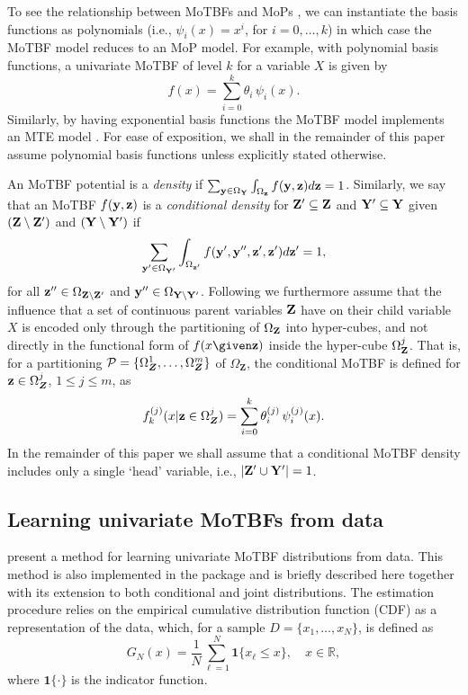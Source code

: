 To see the relationship between MoTBFs and MoPs \citep{She11}, we can instantiate the  basis functions as polynomials (i.e.,
$\psi_i(x)=x^i$, for $i=0,\ldots,k$) in which case the MoTBF model reduces to an MoP model. For
example, with polynomial basis functions, a univariate MoTBF of level $k$ for a variable $X$ is given by
\[
f(x) =   \sum_{i=0}^k \theta_{i}\, \psi_i\left( x \right).
\]
Similarly, by having exponential basis functions the MoTBF model implements an MTE model \citep{Mor01}. 
For ease of exposition, we shall in the remainder of this paper assume polynomial basis functions unless
explicitly stated otherwise.



An MoTBF potential is a \emph{density}\/  if  $\sum_{\mathbf{y}\in \Omega_{\mathbf{Y}}} \int_{\Omega_{\mathbf{z}}}
f(\mathbf{y},\mathbf{z}) d\mathbf{z} = 1$. Similarly, we say that an MoTBF $f(\mathbf{y},\mathbf{z})$ is a \emph{conditional density} for
$\mathbf{Z}'\subseteq \mathbf{Z}$ and $\mathbf{Y}'\subseteq \mathbf{Y}$ given $(\mathbf{Z}\setminus \mathbf{Z}')$ and $(\mathbf{Y}\setminus \mathbf{Y}')$ if  
\[
\sum_{\mathbf{y}'\in \Omega_{\mathbf{Y}'}} \int_{\Omega_{\mathbf{z}'}}
f(\mathbf{y}',\mathbf{y}'',\mathbf{z}',\mathbf{z}') d\mathbf{z}' = 1,
\]
for all $\mathbf{z}''\in \Omega_{\mathbf{Z}\setminus \mathbf{Z}'}$ and $\mathbf{y}''\in
\Omega_{\mathbf{Y}\setminus \mathbf{Y}'}$. Following \cite{Lan12} we furthermore assume that the influence that a set of continuous 
parent variables $\mathbf{Z}$ have on their child variable $X$ is encoded only through the partitioning of $\Omega_{\mathbf{Z}}$ into 
hyper-cubes, and not directly in the functional form of $f(x\given \bmz)$ inside the hyper-cube $\Omega_{\mathbf{Z}}^j$. 
That is, for a partitioning ${\cal P}=\{\Omega_{\boldsymbol{Z}}^1, \ldots, \Omega_{\boldsymbol{Z}}^m\}$ of
$\Omega_{\boldsymbol{Z}}$, the conditional MoTBF
is defined for $ \mathbf{z}\in\Omega_{\boldsymbol{Z}}^j$, $1\leq j\leq m$, as
\begin{equation}
\label{equ:conditional_motbf}
f^{(j)}_k(x | \mathbf{z}\in \Omega_{\boldsymbol{Z}}^j) =  \sum_{i=0}^k    \theta_{i}^{(j)}\, \psi_i^{(j)}(x).   
\end{equation}
In the remainder of this paper we shall assume that a conditional MoTBF density includes only a single `head'
variable, i.e., $|\mathbf{Z}'\cup\mathbf{Y}'|=1$.  


\subsection{Learning univariate MoTBFs from data}
\label{sec:learningUnivariateMOP}



\citet{Lan14} present a method for learning univariate MoTBF distributions from data. This method is also implemented
in the  package and is briefly described here together with its extension to both conditional and
joint distributions.
The estimation procedure relies on the empirical cumulative distribution
function (CDF) as a representation of the data, which, for a sample $D=\{ x_1,\ldots,x_N \}$, is defined as
\begin{equation}
\label{e}
G_N(x) = \frac{1}{N} \sum_{\ell=1}^N \mathbf{1}\{ x_\ell\leq x\}, \quad x\in \mathbb{R},
\end{equation}
where $\mathbf{1}\{ \cdot \}$ is the indicator function. 


